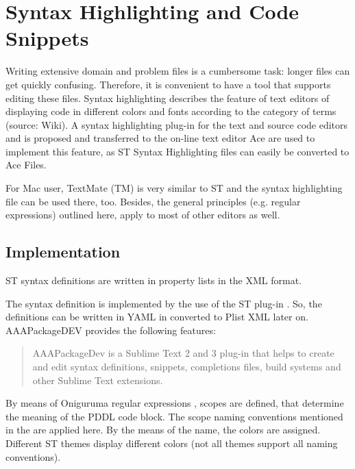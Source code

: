 \documentclass[11pt]{report}
\begin{document}
\section{Syntax Highlighting and Code Snippets}
\label{sec-4-2}
\label{sec:syntax}


Writing extensive domain and problem files is a cumbersome task:
longer files can get quickly confusing. Therefore, it is convenient to
have a tool that supports editing these files. Syntax highlighting
describes the feature of text editors of displaying code in different
colors and fonts according to the category of terms (source: Wiki). A
syntax highlighting plug-in for the text and source code editors
\textcite{sublimetext2} and \textcite{sublimetext3} is proposed and
transferred to the on-line text editor Ace are used to implement this
feature, as ST Syntax Highlighting files can easily be converted to
Ace Files. 

For Mac user, TextMate (TM) is very similar to ST and the syntax
highlighting file can be used there, too. Besides, the general
principles (e.g. regular expressions) outlined here, apply to most of
other editors as well.  

\subsection{Implementation}
\label{sec-4-2-1}
ST syntax definitions are written in property lists in the XML format. 

The syntax definition is implemented by the use of the ST plug-in \textcite{aaapackagedev}. So, the definitions can be
written in YAML in converted to Plist XML later on. AAAPackageDEV provides the
following features:

\begin{quote}
AAAPackageDev is a Sublime Text 2 and 3 plug-in
that helps to create and edit syntax definitions, snippets,
completions files, build systems and other Sublime Text extensions.
\end{quote}

By means of Oniguruma regular expressions \parencite{kosako}, scopes are
defined, that determine the meaning of the PDDL code block. The scope naming
conventions mentioned in the  are applied here. By the means
of the name, the colors are assigned. Different ST themes
display different colors (not all themes support all naming conventions).
\end{document}
